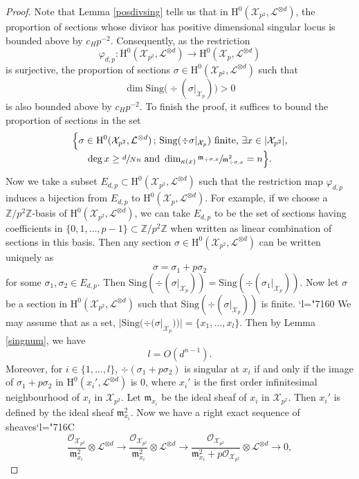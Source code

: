 \documentclass[JEP,XML,SOM,Unicode,published]{cedram}
\newcommand{\Changel}{\mathcode`l="7160}
\newcommand{\Changelback}{\mathcode`l="716C}
\newcommand{\sep}{\,;\,}
\theoremstyle{plain}
\theoremstyle{definition}
\newcommand{\ho}{\mathrm{H}}
\newcommand{\X}{\mathcal{X}}
\newcommand{\li}{\mathcal{L}}
\newcommand{\Z}{\mathbb{Z}}
\begin{document}
\begin{proof}
Note that Lemma \ref{posdivsing} tells us that in $\ho^0(\X_{p^2}, \li^{\otimes d})$, the proportion of sections whose divisor has positive dimensional singular locus is bounded above by $c_Hp^{-2}$. Consequently, as the restriction
\[
\varphi_{d,p}: \ho^0(\X_{p^2}, \li^{\otimes d}) \to \ho^0(\X_p, \li^{\otimes d})
\]
is surjective, the proportion of sections $\sigma\in \ho^0(\X_{p^2}, \li^{\otimes d})$ such that
\[
\dim\mathrm{Sing}\big(\div (\sigma|_{\X_p})\big)>0
\]
is also bounded above by $c_Hp^{-2}$. To finish the proof, it suffices to bound the proportion of sections in the set
\begin{multline*}
\Bigl\{ \sigma\in \ho^0(\X_{p^2}, \li^{\otimes d})\sep \mathrm{Sing}(\div \sigma|_{\X_p}) \text{ finite,}\ \exists x\in |\X_{p^2}|,\\[-3pt] \deg x \geq\sfrac{d}{Nn}\text{ and } \dim_{\kappa(x)}\sfrac{\mathfrak{m}_{\div \sigma,x}}{\mathfrak{m}_{\div \sigma,x}^2}=n \Bigr\}.
\end{multline*}
Now we take a subset $E_{d,p}\subset \ho^0(\X_{p^2}, \li^{\otimes d})$ such that the restriction map $\varphi_{d,p}$ induces a bijection from $E_{d,p}$ to $\ho^0(\X_p, \li^{\otimes d})$. For example, if we choose a $\Z/p^2\Z$-basis of $\ho^0(\X_{p^2}, \li^{\otimes d})$, we can take $E_{d,p}$ to be the set of sections having coefficients in $\{0,1,\dots, p-1\}\subset \Z/p^2\Z$ when written as linear combination of sections in this basis. Then any section $\sigma\in\ho^0(\X_{p^2}, \li^{\otimes d})$ can be written uniquely as
\[
\sigma=\sigma_1+p\sigma_2
\]
for some $\sigma_1,\sigma_2\in E_{d,p}$. Then $\mathrm{Sing}(\div (\sigma|_{\X_p})) =\mathrm{Sing}(\div (\sigma_1|_{\X_p})) $. Now let $\sigma$ be a section in $ \ho^0(\X_{p^2}, \li^{\otimes d})$ such that $\mathrm{Sing}(\div (\sigma|_{\X_p}))$ is finite.
\Changel
We may assume that as a set, $|\mathrm{Sing}(\div (\sigma|_{\X_p}))|=\{ x_1,\dots, x_l \}$. Then by Lemma \ref{singnum}, we have
\[
l=O(d^{n-1}).
\]
Moreover, for $i\in\{1,\dots, l \}$, $\div (\sigma_1+p\sigma_2)$ is singular at $x_i$ if and only if the image of $\sigma_1+p\sigma_2$ in $\ho^0(x_i', \li^{\otimes d})$ is $0$, where $x_i'$ is the first order infinitesimal neighbourhood of $x_i$ in $\X_{p^2}$. Let $\mathfrak{m}_{x_i}$ be the ideal sheaf of $x_i$ in $\X_{p^2}$. Then $x_i'$ is defined by the ideal sheaf $\mathfrak{m}_{x_i}^2$. Now we have a right exact sequence of sheaves\Changelback
\[
\frac{\mathcal{O}_{\X_{p^2}}}{\mathfrak{m}_{x_i}^2}\otimes \li^{\otimes d} \to \frac{\mathcal{O}_{\X_{p^2}}}{\mathfrak{m}_{x_i}^2}\otimes \li^{\otimes d} \to \frac{\mathcal{O}_{\X_{p^2}}}{\mathfrak{m}_{x_i}^2+p\mathcal{O}_{\X_{p^2}}}\otimes \li^{\otimes d}\to 0,
\]
\end{proof}
\end{document}
